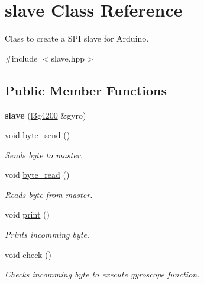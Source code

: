 \hypertarget{classslave}{}\section{slave Class Reference}
\label{classslave}


Class to create a S\+PI slave for Arduino.  




{\ttfamily \#include $<$slave.\+hpp$>$}

\subsection*{Public Member Functions}
\begin{DoxyCompactItemize}
\item 
\mbox{\label{classslave_af73020d7757901f0c58619b2abb6bb44}} 
{\bfseries slave} (\hyperlink{classl3g4200}{l3g4200} \&gyro)
\item 
void \hyperlink{classslave_ad7387f369836c10790362781d5ce92da}{byte\+\_\+send} ()
\begin{DoxyCompactList}\small\item\em Sends byte to master. \end{DoxyCompactList}\item 
void \hyperlink{classslave_af42612432810eefab015f40c32958fe9}{byte\+\_\+read} ()
\begin{DoxyCompactList}\small\item\em Reads byte from master. \end{DoxyCompactList}\item 
void \hyperlink{classslave_a47169cdf6f0aaa0c303c5d860c89bef2}{print} ()
\begin{DoxyCompactList}\small\item\em Prints incomming byte. \end{DoxyCompactList}\item 
void \hyperlink{classslave_ab93bbc9a1b5e8b5fafb01b63e05440b0}{check} ()
\begin{DoxyCompactList}\small\item\em Checks incomming byte to execute gyroscope function. \end{DoxyCompactList}\end{DoxyCompactItemize}
